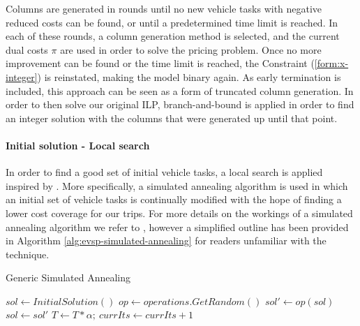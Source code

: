 \documentclass[]{article}
\begin{document}
Columns are generated in rounds until no new vehicle tasks with negative reduced costs can be found, or until a predetermined time limit is reached. In each of these rounds, a column generation method is selected, and the current dual costs $\pi$ are used in order to solve the pricing problem. Once no more improvement can be found or the time limit is reached, the Constraint (\ref{form:x-integer}) is reinstated, making the model binary again. As early termination is included, this approach can be seen as a form of truncated column generation. In order to then solve our original ILP, branch-and-bound is applied in order to find an integer solution with the columns that were generated up until that point.

\paragraph{Initial solution - Local search} \label{sec:evsp-initial-local-search}
In order to find a good set of initial vehicle tasks, a local search is applied inspired by \citet{Bosch21}. More specifically, a simulated annealing algorithm is used in which an initial set of vehicle tasks is continually modified with the hope of finding a lower cost coverage for our trips. For more details on the workings of a simulated annealing algorithm we refer to \citet{Kirk83}, however a simplified outline has been provided in Algorithm \ref{alg:evsp-simulated-annealing} for readers unfamiliar with the technique.

\begin{algorithm}
\caption{Generic Simulated Annealing}\label{alg:evsp-simulated-annealing}
\begin{algorithmic}
\State $sol \gets InitialSolution()$
    \State $op \gets operations.GetRandom()$
    \State $sol' \gets op(sol)$
      $sol \gets sol'$
    \EndIf
    \State $T \gets T * \alpha;\:currIts \gets currIts + 1$
\EndWhile
\end{algorithmic}
\end{algorithm}
\end{document}
